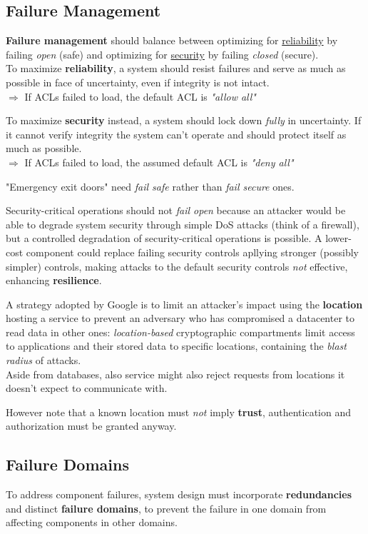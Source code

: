 \subsection{Failure Management}
\textbf{Failure management} should balance between optimizing for \underline{reliability} by failing
\textit{open} (safe) and optimizing for \underline{security} by failing \textit{closed} (secure).\\
To maximize \textbf{reliability}, a system should resist failures and serve as much as possible in face of uncertainty, even if integrity is not intact.\\
$\Longrightarrow$ If ACLs failed to load, the default ACL is \textit{"allow all"}

To maximize \textbf{security} instead, a system should lock down \textit{fully} in uncertainty.
If it cannot verify integrity the system can’t operate and should protect itself as much as possible.\\
$\Longrightarrow$ If ACLs failed to load, the assumed default ACL is \textit{"deny all"}
\begin{center}
   "Emergency exit doors" need \textit{fail safe} rather than \textit{fail secure} ones.
\end{center}

Security-critical operations should not \textit{fail open} because an attacker would be able to degrade system security through simple DoS attacks (think of a firewall),
but a controlled degradation of security-critical operations is possible.
A lower-cost component could replace failing security controls apllying stronger (possibly simpler) controls, making attacks to the default security controls \textit{not} effective, enhancing \textbf{resilience}.
\nl

A strategy adopted by Google is to limit an attacker’s impact using the \textbf{location} hosting a service to prevent
an adversary who has compromised a datacenter to read data in other ones:
\textit{location-based} cryptographic compartments limit access to applications and
their stored data to specific locations, containing the \textit{blast radius} of attacks.\\
Aside from databases, also service might also reject requests from locations it doesn’t expect to
communicate with.

However note that a known location must \textit{not} imply \textbf{trust}, authentication and authorization must be granted anyway.

\subsection{Failure Domains}
To address component failures, 
system design must incorporate \textbf{redundancies} and distinct
\textbf{failure domains},
to prevent the failure in one domain from affecting components in other domains.


